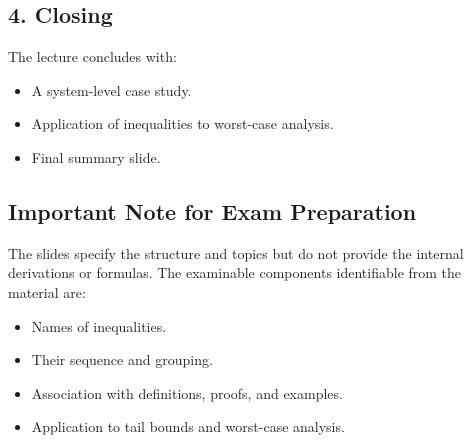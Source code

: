 \documentclass{article}
\begin{document}
\subsection*{4. Closing}
The lecture concludes with:
\begin{itemize}
    \item A system-level case study.
    \item Application of inequalities to worst-case analysis.
    \item Final summary slide.
\end{itemize}

\subsection*{Important Note for Exam Preparation}
The slides specify the structure and topics but do not provide the internal derivations or formulas. The examinable components identifiable from the material are:
\begin{itemize}
    \item Names of inequalities.
    \item Their sequence and grouping.
    \item Association with definitions, proofs, and examples.
    \item Application to tail bounds and worst-case analysis.
\end{itemize}
\end{document}
